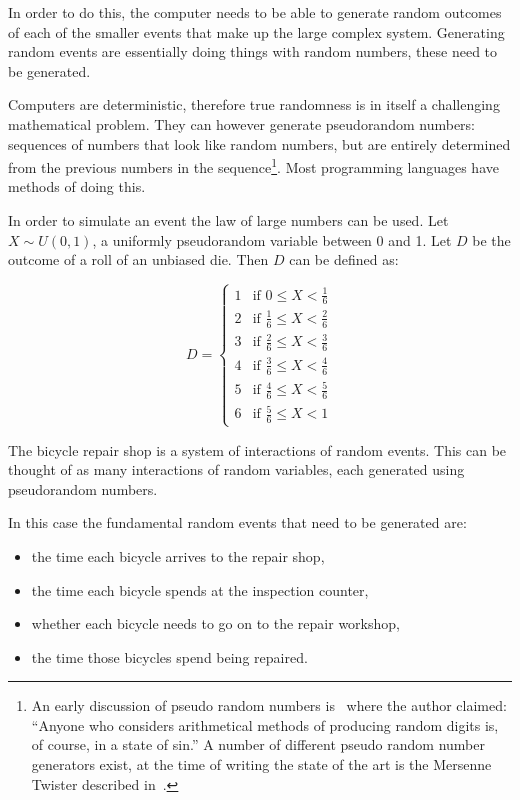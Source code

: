 In order to do this, the computer needs to be able to generate random outcomes
of each of the smaller events that make up the large complex system. Generating
random events are essentially doing things with random numbers, these need to be
generated.

Computers are deterministic, therefore true randomness is in itself a
challenging mathematical problem.
They can however generate pseudorandom numbers: sequences of numbers that look
like random numbers, but are entirely determined from the
previous numbers in the sequence\footnote{An early
discussion of pseudo random numbers is~\autocite{von195113} where the author
claimed: ``Anyone who considers arithmetical methods of producing random digits
is, of course, in a state of sin.'' A number of different pseudo random
number generators exist, at the time of writing the state of the art is the
Mersenne Twister described in~\autocite{matsumoto1998mersenne}. }.
Most programming languages have methods of
doing this.

In order to simulate an event the law of large numbers can be used.
Let \(X \sim U(0, 1)\), a uniformly pseudorandom variable between 0 and 1.
Let \(D\) be the outcome of a roll of an unbiased die. Then \(D\) can be defined as:

\begin{equation}
D =
  \begin{cases}
    1 & \text{if } 0 \leq X < \frac{1}{6}\\
    2 & \text{if } \frac{1}{6} \leq X < \frac{2}{6}\\
    3 & \text{if } \frac{2}{6} \leq X < \frac{3}{6}\\
    4 & \text{if } \frac{3}{6} \leq X < \frac{4}{6}\\
    5 & \text{if } \frac{4}{6} \leq X < \frac{5}{6}\\
    6 & \text{if } \frac{5}{6} \leq X < 1
  \end{cases}
\end{equation}

The bicycle repair shop is a system of interactions of
random events. This can be thought of as many interactions of random
variables, each generated using pseudorandom numbers.

In this case the fundamental random events that need to be generated are:

\begin{itemize}
  \item the time each bicycle arrives to the repair shop,
  \item the time each bicycle spends at the inspection counter,
  \item whether each bicycle needs to go on to the repair workshop,
  \item the time those bicycles spend being repaired.
\end{itemize}

